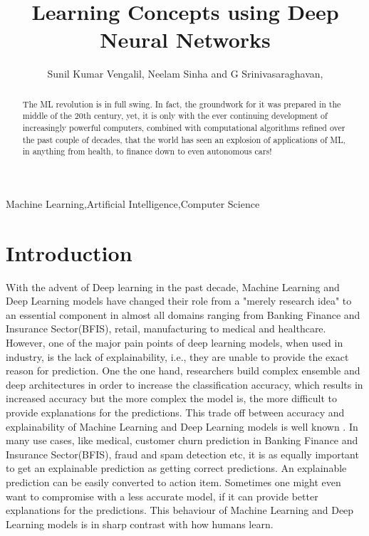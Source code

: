 \documentclass{JMLFS}
\begin{document}
\title{Learning Concepts using Deep Neural Networks}

\author{Sunil Kumar Vengalil, Neelam Sinha  and G Srinivasaraghavan,}
\address{$^1$International Institute of Information Technology Bangalore}
\address{$^2$International Institute of Information Technology Bangalore}
\address{$^3$International Institute of Information Technology Bangalore}

\begin{abstract}
The ML revolution is in full swing. In fact, the groundwork for it was prepared in the middle of the 20th century, yet, it is only with the ever continuing development of increasingly powerful computers, combined with computational algorithms refined over the past couple of decades, that the world has seen an explosion of applications of ML, in anything from health, to finance down to even autonomous cars!
\end{abstract}

\maketitle

\begin{keyword}
Machine Learning\sep Artificial Intelligence\sep Computer Science
\end{keyword}

\section{Introduction}
With the advent of Deep learning in the past decade,  Machine Learning and Deep Learning models have changed their role from a "merely research idea" to an essential component in almost all domains ranging from Banking Finance and Insurance Sector(BFIS), retail, manufacturing to medical\cite{jordan2015} and healthcare.
However, one of the major pain points of deep learning models, when used in industry, is the lack of explainability, i.e., they are unable to provide the exact reason for prediction.
One the one hand, researchers build complex ensemble and deep architectures in order to increase the classification accuracy, which results in increased accuracy but the more complex the model is, the more difficult to provide explanations for the predictions.
This trade off between accuracy and explainability of Machine Learning and Deep Learning models is well known \cite{wu2021}.
In many use cases, like medical, customer churn prediction in Banking Finance and Insurance Sector(BFIS), fraud and spam detection etc, it is as equally important to get an explainable prediction as getting correct predictions.
An explainable prediction can be easily converted to action item.
Sometimes one might even want to compromise with a less accurate model, if it can provide better explanations for the predictions.
This behaviour of Machine Learning and Deep Learning models is in sharp contrast with how humans learn.
\end{document}
